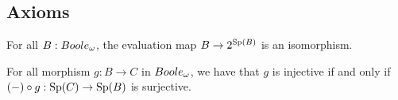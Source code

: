 \subsection{Axioms}\label{Axioms}
\begin{axiom}\label{AxStoneDuality}
  For all $B:\Boole$, 
  the evaluation map $B\rightarrow  2^{\operatorname{Sp}(B)}$ is an isomorphism.
\end{axiom} 


\begin{axiom}\label{SurjectionsAreFormalSurjections}
  For all morphism $g:B\to C$ in $\Boole$, we have that $g$ is injective if and only if
  $(-)\circ g: \operatorname{Sp}(C) \to \operatorname{Sp}(B)$ is surjective. 
\end{axiom} 
%

